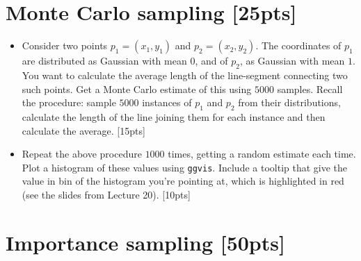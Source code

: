 \documentclass[10pt]{article}
\begin{document}
\section{Monte Carlo sampling \hfill[25pts]}
    \begin{itemize}
      \item Consider two points $p_1=(x_1,y_1)$ and $p_2 = (x_2,y_2)$. The
        coordinates of $p_1$ are distributed as Gaussian with mean $0$, and
        of $p_2$, as Gaussian with mean $1$. You want to calculate the average
        length of the line-segment connecting two such points. Get a
        Monte Carlo estimate of this using $5000$ samples. Recall the procedure:
        sample $5000$ instances of $p_1$ and $p_2$ from their distributions, 
        calculate the length of
        the line joining them for each instance and then calculate the average.
        \hfill[15pts]
      \item Repeat the above procedure $1000$ times, getting a random estimate 
        each time. Plot a histogram of these values using {\tt ggvis}. Include
        a tooltip that give the value in bin of the histogram you're pointing
        at, which is highlighted in red (see the slides from Lecture 20).
        \hfill[10pts]
    \end{itemize}

\section{Importance sampling \hfill[50pts]}
\end{document}
